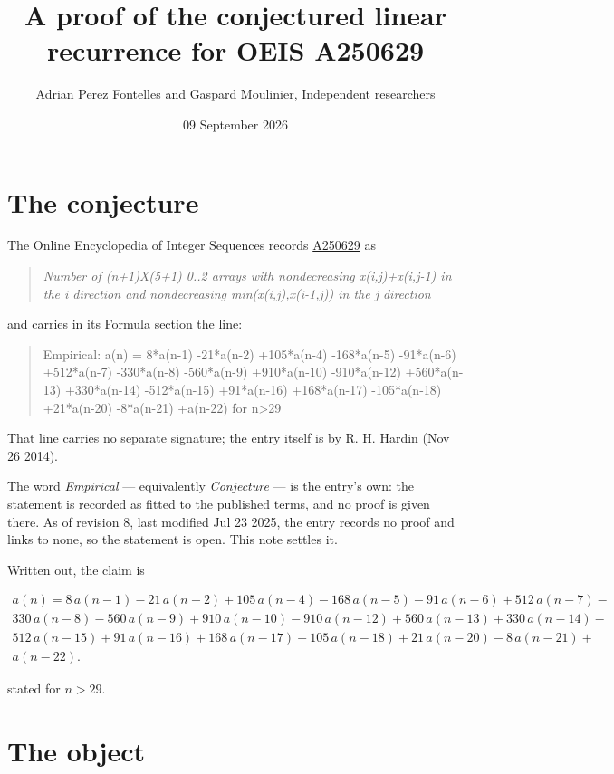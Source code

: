 \documentclass[11pt]{article}
\title{A proof of the conjectured linear recurrence for OEIS A250629}
\author{Adrian Perez Fontelles and Gaspard Moulinier, Independent researchers}
\date{09 September 2026}
\theoremstyle{definition}
\begin{document}
\maketitle
\section{The conjecture}

The Online Encyclopedia of Integer Sequences records \href{https://oeis.org/A250629}{A250629} as

\begin{quote}\itshape Number of (n+1)X(5+1) 0..2 arrays with nondecreasing x(i,j)+x(i,j-1) in the i direction and nondecreasing min(x(i,j),x(i-1,j)) in the j direction\end{quote}

and carries in its Formula section the line:

\begin{quote}\ttfamily Empirical: a(n) = 8*a(n-1) -21*a(n-2) +105*a(n-4) -168*a(n-5) -91*a(n-6) +512*a(n-7) -330*a(n-8) -560*a(n-9) +910*a(n-10) -910*a(n-12) +560*a(n-13) +330*a(n-14) -512*a(n-15) +91*a(n-16) +168*a(n-17) -105*a(n-18) +21*a(n-20) -8*a(n-21) +a(n-22) for n>29\end{quote}

That line carries no separate signature; the entry itself is by R. H. Hardin (Nov 26 2014).

The word {\itshape Empirical} --- equivalently {\itshape Conjecture} --- is the entry's own: the statement is recorded as fitted to the published terms, and no proof is given there. As of revision 8, last modified Jul 23 2025, the entry records no proof and links to none, so the statement is open. This note settles it.

Written out, the claim is

\begin{multline*} a(n) = 8\,a(n-1) - 21\,a(n-2) + 105\,a(n-4) - 168\,a(n-5) - 91\,a(n-6) + 512\,a(n-7) - \\ 330\,a(n-8) - 560\,a(n-9) + 910\,a(n-10) - 910\,a(n-12) + 560\,a(n-13) + 330\,a(n-14) - \\ 512\,a(n-15) + 91\,a(n-16) + 168\,a(n-17) - 105\,a(n-18) + 21\,a(n-20) - 8\,a(n-21) + \\ a(n-22). \end{multline*}

stated for $n > 29$.

\section{The object}
\end{document}
